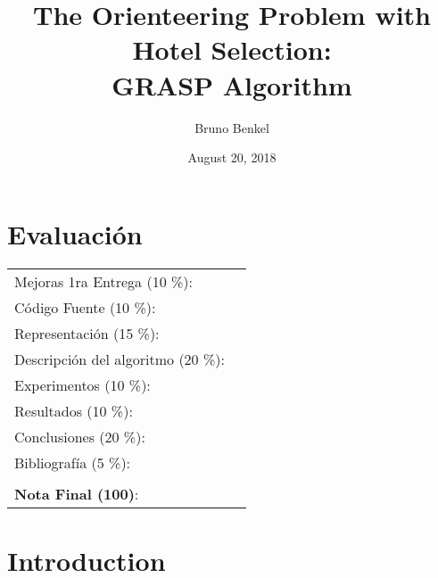 \documentclass[letter, 10pt]{article}
\begin{document}
\title{The Orienteering Problem with Hotel Selection:\\GRASP Algorithm}
\author{Bruno Benkel}
\date{August 20, 2018}
\maketitle


\section*{Evaluaci\'on}

\begin{tabular}{ll}
Mejoras 1ra Entrega (10 \%): &  \underline{\hspace{2cm}}\\
C\'odigo Fuente (10 \%): &  \underline{\hspace{2cm}}\\
Representaci\'on (15 \%):  & \underline{\hspace{2cm}} \\
Descripci\'on del algoritmo (20 \%):  & \underline{\hspace{2cm}} \\
Experimentos (10 \%):  & \underline{\hspace{2cm}} \\
Resultados (10 \%):  & \underline{\hspace{2cm}} \\
Conclusiones (20 \%): &  \underline{\hspace{2cm}}\\
Bibliograf\'ia (5 \%): & \underline{\hspace{2cm}}\\
 &  \\
\textbf{Nota Final (100)}:   & \underline{\hspace{2cm}}
\end{tabular}
\vspace{2cm}


\begin{abstract}
\end{abstract}

\newpage

\section{Introduction} %

\end{document}
